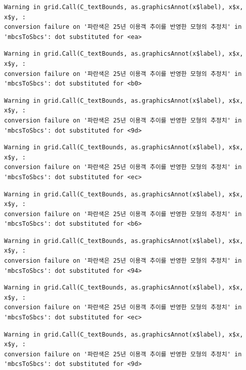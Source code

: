 \documentclass[
  letterpaper,
  DIV=11,
  numbers=noendperiod]{scrreprt}
\begin{document}
\begin{verbatim}
Warning in grid.Call(C_textBounds, as.graphicsAnnot(x$label), x$x, x$y, :
conversion failure on '파란색은 25년 이용객 추이를 반영한 모형의 추정치' in
'mbcsToSbcs': dot substituted for <ea>
\end{verbatim}

\begin{verbatim}
Warning in grid.Call(C_textBounds, as.graphicsAnnot(x$label), x$x, x$y, :
conversion failure on '파란색은 25년 이용객 추이를 반영한 모형의 추정치' in
'mbcsToSbcs': dot substituted for <b0>
\end{verbatim}

\begin{verbatim}
Warning in grid.Call(C_textBounds, as.graphicsAnnot(x$label), x$x, x$y, :
conversion failure on '파란색은 25년 이용객 추이를 반영한 모형의 추정치' in
'mbcsToSbcs': dot substituted for <9d>
\end{verbatim}

\begin{verbatim}
Warning in grid.Call(C_textBounds, as.graphicsAnnot(x$label), x$x, x$y, :
conversion failure on '파란색은 25년 이용객 추이를 반영한 모형의 추정치' in
'mbcsToSbcs': dot substituted for <ec>
\end{verbatim}

\begin{verbatim}
Warning in grid.Call(C_textBounds, as.graphicsAnnot(x$label), x$x, x$y, :
conversion failure on '파란색은 25년 이용객 추이를 반영한 모형의 추정치' in
'mbcsToSbcs': dot substituted for <b6>
\end{verbatim}

\begin{verbatim}
Warning in grid.Call(C_textBounds, as.graphicsAnnot(x$label), x$x, x$y, :
conversion failure on '파란색은 25년 이용객 추이를 반영한 모형의 추정치' in
'mbcsToSbcs': dot substituted for <94>
\end{verbatim}

\begin{verbatim}
Warning in grid.Call(C_textBounds, as.graphicsAnnot(x$label), x$x, x$y, :
conversion failure on '파란색은 25년 이용객 추이를 반영한 모형의 추정치' in
'mbcsToSbcs': dot substituted for <ec>
\end{verbatim}

\begin{verbatim}
Warning in grid.Call(C_textBounds, as.graphicsAnnot(x$label), x$x, x$y, :
conversion failure on '파란색은 25년 이용객 추이를 반영한 모형의 추정치' in
'mbcsToSbcs': dot substituted for <9d>
\end{verbatim}
\end{document}
